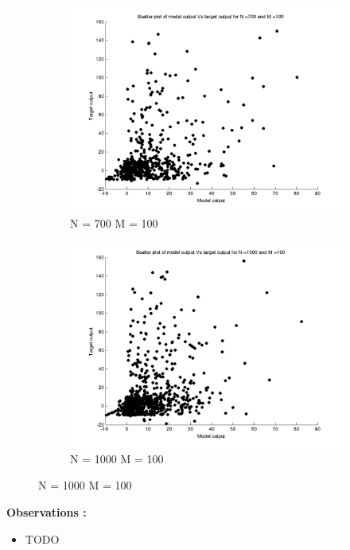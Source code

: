 \documentclass{article}
\begin{document}
\begin{figure}[H]
\begin{subfigure}{.5\textwidth}
\centering
\includegraphics[width=\linewidth]{D2/Scatter/VaryingN_N700M100}
\caption{N = 700 M = 100}
\end{subfigure}
\begin{subfigure}{.5\textwidth}
\includegraphics[width=\linewidth]{D2/Scatter/VaryingN_N1000M100}
\caption{N = 1000 M = 100}
\end{subfigure}



\end{figure}


\textbf{Observations :}

\begin{itemize}
\item TODO
\end{itemize}
\end{document}
